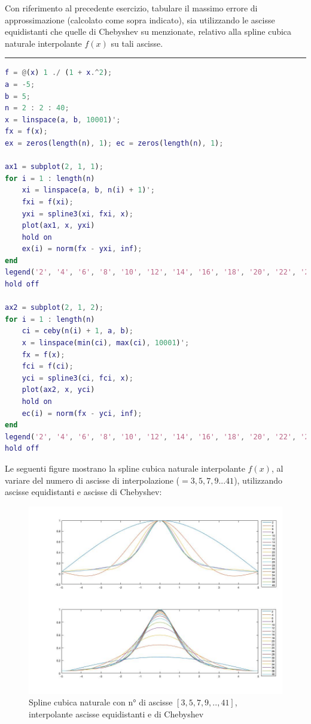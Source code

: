 Con riferimento al precedente esercizio, tabulare il massimo errore di approssimazione (calcolato come sopra indicato), sia utilizzando le ascisse equidistanti
che quelle di Chebyshev su menzionate, relativo alla spline cubica naturale interpolante $f(x)$ su tali ascisse.

\hspace*{\fill}
\par\noindent\rule{\textwidth}{0.4pt}
\hspace*{\fill}

\begin{lstlisting}[language=Matlab, caption=Codice Matlab]
f = @(x) 1 ./ (1 + x.^2);
a = -5;
b = 5;
n = 2 : 2 : 40;
x = linspace(a, b, 10001)';
fx = f(x);
ex = zeros(length(n), 1); ec = zeros(length(n), 1);

ax1 = subplot(2, 1, 1);
for i = 1 : length(n)
	xi = linspace(a, b, n(i) + 1)';
	fxi = f(xi);
	yxi = spline3(xi, fxi, x);
	plot(ax1, x, yxi)
	hold on
	ex(i) = norm(fx - yxi, inf);
end
legend('2', '4', '6', '8', '10', '12', '14', '16', '18', '20', '22', '24', '26', '28', '30', '32', '34', '36', '38', '40')
hold off

ax2 = subplot(2, 1, 2);
for i = 1 : length(n)
	ci = ceby(n(i) + 1, a, b);
	x = linspace(min(ci), max(ci), 10001)';
	fx = f(x);
	fci = f(ci);
	yci = spline3(ci, fci, x);
	plot(ax2, x, yci)
	hold on
	ec(i) = norm(fx - yci, inf);
end
legend('2', '4', '6', '8', '10', '12', '14', '16', '18', '20', '22', '24', '26', '28', '30', '32', '34', '36', '38', '40')
hold off
\end{lstlisting}

Le seguenti figure mostrano la spline cubica naturale interpolante $f(x)$, al variare del numero di ascisse di interpolazione ($=3,5,7,9...41$), utilizzando ascisse equidistanti e ascisse di Chebyshev:
\begin{figure}[H]
	\includegraphics[width=\textwidth]{Chapter-4/Exercise-20/plot.jpg}
	\caption*{Spline cubica naturale con n° di ascisse $[3,5,7,9,..,41]$, interpolante ascisse equidistanti e di Chebyshev}
\end{figure}

